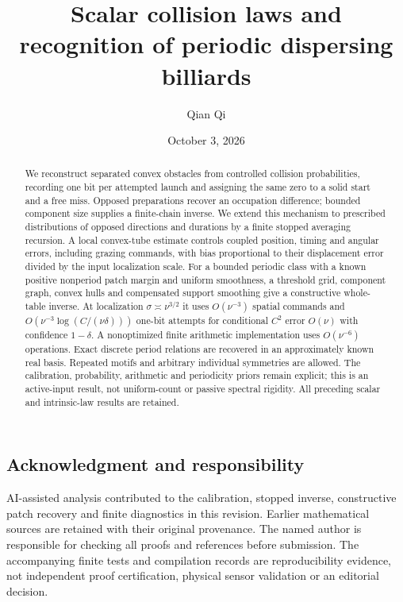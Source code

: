 \documentclass[11pt]{amsart}
\title[Scalar collision laws]{Scalar collision laws and recognition of periodic dispersing billiards}
\author{Qian Qi}\date{October 3, 2026}
\theoremstyle{definition}\newtheorem{definition}[theorem]{Definition}
\theoremstyle{remark}\newtheorem{remark}[theorem]{Remark}
\numberwithin{equation}{section}
\begin{document}
\raggedbottom
\begin{abstract}
We reconstruct separated convex obstacles from controlled collision
probabilities, recording one bit per attempted launch and assigning the
same zero to a solid start and a free miss. Opposed preparations recover
an occupation difference; bounded component size supplies a finite-chain
inverse. We extend this mechanism to prescribed distributions of opposed
directions and durations by a finite stopped averaging recursion. A local
convex-tube estimate controls coupled position, timing and angular errors,
including grazing commands, with bias proportional to their displacement
error divided by the input localization scale. For a bounded periodic
class with a known positive nonperiod patch margin and uniform smoothness,
a threshold grid, component graph, convex hulls and compensated support
smoothing give a constructive whole-table inverse. At localization
$\sigma\asymp\nu^{3/2}$ it uses $O(\nu^{-3})$ spatial commands and
$O(\nu^{-3}\log(C/(\nu\delta)))$ one-bit attempts for conditional
$C^2$ error $O(\nu)$ with confidence $1-\delta$. A nonoptimized finite
arithmetic implementation uses $O(\nu^{-6})$ operations. Exact discrete
period relations are recovered in an approximately known real basis.
Repeated motifs and arbitrary individual symmetries are allowed. The
calibration, probability, arithmetic and periodicity priors remain
explicit; this is an active-input result, not uniform-count or passive
spectral rigidity. All preceding scalar and intrinsic-law results are
retained.
\end{abstract}\maketitle









\subsection*{Acknowledgment and responsibility}
AI-assisted analysis contributed to the calibration, stopped inverse,
constructive patch recovery and finite diagnostics in this revision.
Earlier mathematical sources are retained with their original provenance.
The named author is responsible for checking all proofs and references
before submission. The accompanying finite tests and compilation records
are reproducibility evidence, not independent proof certification,
physical sensor validation or an editorial decision.

\end{document}
